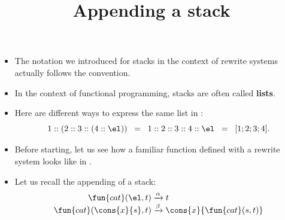 \documentclass[wide]{slides}
\begin{document}
\begin{slide}
  \title{Appending a stack}

  \begin{itemize}

    \item The notation we introduced for stacks in the context of
      rewrite systems actually follows the \OCaml convention.

    \item In the context of functional programming, stacks are often
      called \textbf{lists}.

    \item Here are different ways to express the same list in \OCaml:
      \begin{equation*}
        1::(2::3::(4::\el)) \;\; = \;\; 1::2::3::4::\el \;\; = \;\; [1;2;3;4].
      \end{equation*}

    \item Before starting, let us see how a familiar function defined
      with a rewrite system looks like in \OCaml.

    \item Let us recall the appending of a stack:
      \begin{align*}
        \fun{cat}(        \el,t) &\xrightarrow{\alpha} t\\
        \fun{cat}(\cons{x}{s},t) &\xrightarrow{\smash\beta}
        \cons{x}{\fun{cat}(s,t)}
      \end{align*}

  \end{itemize}
\end{slide}
\end{document}
